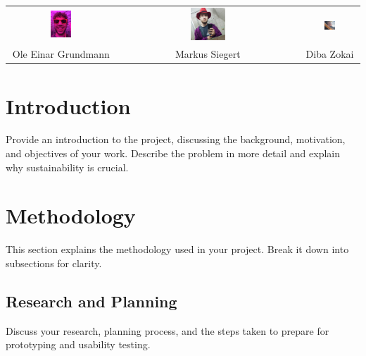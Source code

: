 \documentclass{article}
\begin{document}
\begin{titlepage}
\begin{center}
    \begin{tabular}{ccc}
        \includegraphics[width=0.2\textwidth]{./resources/ole.png} &
        \includegraphics[width=0.2\textwidth]{./resources/markus.png} &
        \includegraphics[width=0.2\textwidth]{./resources/diba.png} \\[0.3cm]
        Ole Einar Grundmann & Markus Siegert & Diba Zokai \\
    \end{tabular}
\end{center}
\end{titlepage}

\newpage
\tableofcontents
\newpage

\section{Introduction}
Provide an introduction to the project, discussing the background, motivation, and objectives of your work. Describe the problem in more detail and explain why sustainability is crucial.

\section{Methodology}
This section explains the methodology used in your project. Break it down into subsections for clarity.

\subsection{Research and Planning}
Discuss your research, planning process, and the steps taken to prepare for prototyping and usability testing.
\end{document}
